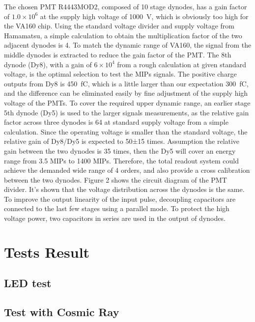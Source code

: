 \documentclass[5p, times]{elsarticle}
\begin{document}
The chosen PMT R4443MOD2, composed of 10 stage dynodes, has a gain factor of $1.0\times 10^6$ at the supply high voltage of \SI{1000}{\volt}, which is obviously too high for the VA160 chip. 
Using the standard voltage divider and supply voltage from Hamamatsu, a simple calculation to obtain the multiplication factor of the two adjacent dynodes is 4. 
To match the dynamic range of VA160, the signal from the middle dynodes is extracted to reduce the gain factor of the PMT. 
The 8th dynode (Dy8), with a gain of $6\times 10^4$ from a rough calculation at given standard voltage, is the optimal selection to test the MIPs signals. 
The positive charge outputs from Dy8 is \SI{450}{\femto\coulomb}, which is a little larger than our expectation \SI{300}{\femto\coulomb}, and the difference can be eliminated easily by fine adjustment of the supply high voltage of the PMTs. 
To cover the required upper dynamic range, an earlier stage 5th dynode (Dy5) is used to the larger signals measurements, as the relative gain factor across three dynodes is 64 at standard supply voltage from a simple calculation. 
Since the operating voltage is smaller than the standard voltage, the relative gain of Dy8/Dy5 is expected to 50±15 times. 
Assumption the relative gain between the two dynodes is 35 times, then the Dy5 will cover an energy range from 3.5 MIPs to 1400 MIPs. 
Therefore, the total readout system could achieve the demanded wide range of 4 orders, and also provide a cross calibration between the two dynodes. 
Figure 2 shows the circuit diagram of the PMT divider. 
It’s shown that the voltage distribution across the dynodes is the same. 
To improve the output linearity of the input pulse, decoupling capacitors are connected to the last few stages using a parallel mode. 
To protect the high voltage power, two capacitors in series are used in the output of dynodes.

\section{Tests Result}
\label{sec:result}

\subsection{LED test}

\subsection{Test with Cosmic Ray}
\label{sec:cosmicray}
\end{document}

